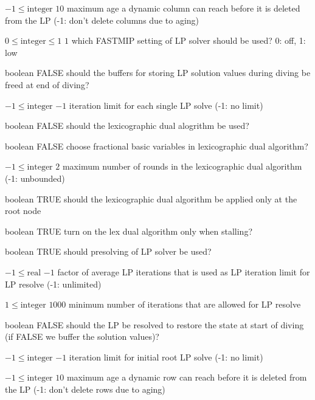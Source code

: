 %
{$-1\leq\textrm{integer}$}%
{$10$}%
{maximum age a dynamic column can reach before it is deleted from the LP (-1: don't delete columns due to aging)}%
{}

%
{$0\leq\textrm{integer}\leq1$}%
{$1$}%
{which FASTMIP setting of LP solver should be used? 0: off, 1: low}%
{}

%
{boolean}%
{FALSE}%
{should the buffers for storing LP solution values during diving be freed at end of diving?}%
{}

%
{$-1\leq\textrm{integer}$}%
{$-1$}%
{iteration limit for each single LP solve (-1: no limit)}%
{}

%
{boolean}%
{FALSE}%
{should the lexicographic dual alogrithm be used?}%
{}

%
{boolean}%
{FALSE}%
{choose fractional basic variables in lexicographic dual algorithm?}%
{}

%
{$-1\leq\textrm{integer}$}%
{$2$}%
{maximum number of rounds in the  lexicographic dual algorithm (-1: unbounded)}%
{}

%
{boolean}%
{TRUE}%
{should the lexicographic dual algorithm be applied only at the root node}%
{}

%
{boolean}%
{TRUE}%
{turn on the lex dual algorithm only when stalling?}%
{}

%
{boolean}%
{TRUE}%
{should presolving of LP solver be used?}%
{}

%
{$-1\leq\textrm{real}$}%
{$-1$}%
{factor of average LP iterations that is used as LP iteration limit for LP resolve (-1: unlimited)}%
{}

%
{$1\leq\textrm{integer}$}%
{$1000$}%
{minimum number of iterations that are allowed for LP resolve}%
{}

%
{boolean}%
{FALSE}%
{should the LP be resolved to restore the state at start of diving (if FALSE we buffer the solution values)?}%
{}

%
{$-1\leq\textrm{integer}$}%
{$-1$}%
{iteration limit for initial root LP solve (-1: no limit)}%
{}

%
{$-1\leq\textrm{integer}$}%
{$10$}%
{maximum age a dynamic row can reach before it is deleted from the LP (-1: don't delete rows due to aging)}%
{}

